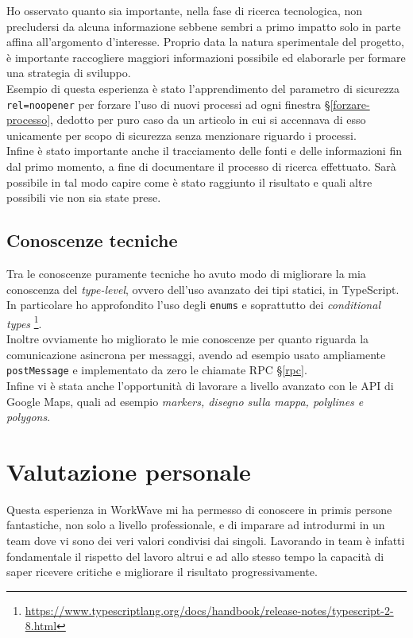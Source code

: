 Ho osservato quanto sia importante, nella fase di ricerca tecnologica, non precludersi da alcuna informazione sebbene sembri a primo impatto solo in parte affina all'argomento d'interesse. Proprio data la natura sperimentale del progetto, è importante raccogliere maggiori informazioni possibile ed elaborarle per formare una strategia di sviluppo. \\

Esempio di questa esperienza è stato l'apprendimento del parametro di sicurezza \texttt{rel=noopener} per forzare l'uso di nuovi processi ad ogni finestra §\ref{forzare-processo}, dedotto per puro caso da un articolo in cui si accennava di esso unicamente per scopo di sicurezza senza menzionare riguardo i processi. \\

Infine è stato importante anche il tracciamento delle fonti e delle informazioni fin dal primo momento, a fine di documentare il processo di ricerca effettuato. Sarà possibile in tal modo capire come è stato raggiunto il risultato e quali altre possibili vie non sia state prese.

\subsection{Conoscenze tecniche}

Tra le conoscenze puramente tecniche ho avuto modo di migliorare la mia conoscenza del \textit{type-level}, ovvero dell'uso avanzato dei tipi statici, in TypeScript. In particolare ho approfondito l'uso degli \texttt{enums} e soprattutto dei \textit{conditional types} \footnote{\url{https://www.typescriptlang.org/docs/handbook/release-notes/typescript-2-8.html}}. \\

Inoltre ovviamente ho migliorato le mie conoscenze per quanto riguarda la comunicazione asincrona per messaggi, avendo ad esempio usato ampliamente \texttt{postMessage} e implementato da zero le chiamate RPC §\ref{rpc}. \\

Infine vi è stata anche l'opportunità di lavorare a livello avanzato con le API di Google Maps, quali ad esempio \textit{markers, disegno sulla mappa, polylines e polygons}.

\section{Valutazione personale}

Questa esperienza in WorkWave mi ha permesso di conoscere in primis persone fantastiche, non solo a livello professionale, e di imparare ad introdurmi in un team dove vi sono dei veri valori condivisi dai singoli. Lavorando in team è infatti fondamentale il rispetto del lavoro altrui e ad allo stesso tempo la capacità di saper ricevere critiche e migliorare il risultato progressivamente.


